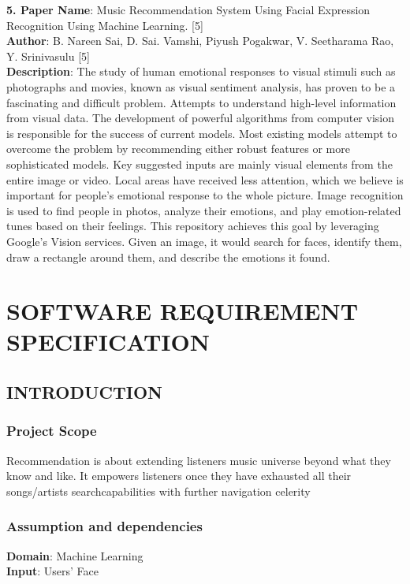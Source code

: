 \documentclass[12pt]{report}
\begin{document}
\setlength{\parindent}{0em}
\textbf{5. Paper Name}:  Music Recommendation System Using Facial Expression Recognition Using 
Machine Learning. [5]\\
\textbf{Author}: B. Nareen Sai, D. Sai. Vamshi, Piyush Pogakwar, V. Seetharama Rao, Y. 
Srinivasulu [5]\\
\textbf{Description}:  The study of human emotional responses to visual stimuli such as photographs 
and movies, known as visual sentiment analysis, has proven to be a fascinating and difficult 
problem. Attempts to understand high-level information from visual data. The development 
of powerful algorithms from computer vision is responsible for the success of current 
models. Most existing models attempt to overcome the problem by recommending either 
robust features or more sophisticated models. Key suggested inputs are mainly visual 
elements from the entire image or video. Local areas have received less attention, which we 
believe is important for people's emotional response to the whole picture. Image recognition 
is used to find people in photos, analyze their emotions, and play emotion-related tunes based 
on their feelings. This repository achieves this goal by leveraging Google's Vision services. 
Given an image, it would search for faces, identify them, draw a rectangle around them, and 
describe the emotions it found.
\clearpage

\centering
\section{SOFTWARE REQUIREMENT SPECIFICATION}
\raggedright
\subsection{INTRODUCTION}

\justifying
\setlength{\parindent}{4em}
\setlength{\parskip}{0.5em}
\renewcommand{\baselinestretch}{1.5}

\normalsize
\hspace{1.7cm}\subsubsection{Project Scope}
Recommendation is about extending listeners music universe beyond what they know and
like. It empowers listeners once they have exhausted all their songs/artists searchcapabilities
with further navigation celerity
\hspace{1.7cm}\subsubsection{ Assumption and dependencies}
\textbf{Domain}: Machine Learning\\
\textbf{Input}: Users’ Face
\end{document}
